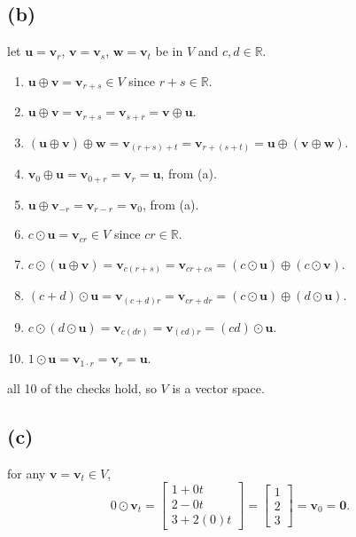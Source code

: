 \documentclass{article}
\begin{document}
\subsection*{(b)}

let $\mathbf{u} = \mathbf{v}_r$, $\mathbf{v} = \mathbf{v}_s$, $\mathbf{w} = \mathbf{v}_t$
be in $V$ and $c, d \in \mathbb{R}$.

\begin{enumerate}
  \item $\mathbf{u} \oplus \mathbf{v} = \mathbf{v}_{r+s} \in V$ since $r + s \in \mathbb{R}$.
  \item $\mathbf{u} \oplus \mathbf{v} = \mathbf{v}_{r+s} = \mathbf{v}_{s+r} = \mathbf{v} \oplus \mathbf{u}$.
  \item $(\mathbf{u} \oplus \mathbf{v}) \oplus \mathbf{w} = \mathbf{v}_{(r+s)+t}
        = \mathbf{v}_{r+(s+t)} = \mathbf{u} \oplus (\mathbf{v} \oplus \mathbf{w})$.
  \item $\mathbf{v}_0 \oplus \mathbf{u} = \mathbf{v}_{0+r} = \mathbf{v}_r = \mathbf{u}$, from (a).
  \item $\mathbf{u} \oplus \mathbf{v}_{-r} = \mathbf{v}_{r-r} = \mathbf{v}_0$, from (a).
  \item $c \odot \mathbf{u} = \mathbf{v}_{cr} \in V$ since $cr \in \mathbb{R}$.
  \item $c \odot (\mathbf{u} \oplus \mathbf{v}) = \mathbf{v}_{c(r+s)} = \mathbf{v}_{cr+cs}
        = (c \odot \mathbf{u}) \oplus (c \odot \mathbf{v})$.
  \item $(c + d) \odot \mathbf{u} = \mathbf{v}_{(c+d)r} = \mathbf{v}_{cr+dr}
        = (c \odot \mathbf{u}) \oplus (d \odot \mathbf{u})$.
  \item $c \odot (d \odot \mathbf{u}) = \mathbf{v}_{c(dr)} = \mathbf{v}_{(cd)r}
        = (cd) \odot \mathbf{u}$.
  \item $1 \odot \mathbf{u} = \mathbf{v}_{1 \cdot r} = \mathbf{v}_r = \mathbf{u}$.
\end{enumerate}
all 10 of the checks hold, so $V$ is a vector space.

\subsection*{(c)}

for any $\mathbf{v} = \mathbf{v}_t \in V$,
\[
0 \odot \mathbf{v}_t
= \begin{bmatrix} 1 + 0t \\ 2 - 0t \\ 3 + 2(0)t \end{bmatrix}
= \begin{bmatrix} 1 \\ 2 \\ 3 \end{bmatrix}
= \mathbf{v}_0 = \mathbf{0}.
\]
\end{document}
